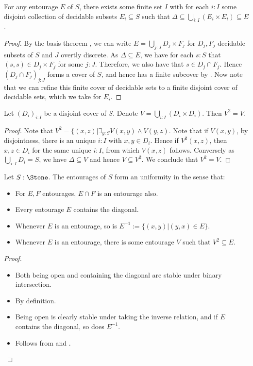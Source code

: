 \begin{lemma}\label{EntourageAsDisjointProduct}
  For any entourage $E$ of $S$, there exists some finite set $I$ with for each $i:I$ some disjoint collection of decidable subsets $E_i\subseteq S$ such that  $\Delta\subseteq \bigcup_{i:I} (E_i \times E_i)\subseteq E$. 
\end{lemma}
\begin{proof}
  By the basis theorem , we can write $E= \bigcup_{j:J} D_j \times F_j$ for $D_j, F_j$ decidable subsets of $S$ and $J$ overtly discrete. 
%
  As $\Delta \subseteq E$, we have for each $s:S$ that $(s,s) \in D_j \times F_j$ for some $j:J$. Therefore, we also have that $s\in D_j \cap F_j$. Hence $(D_j\cap F_j)_{j:J}$ forms a cover of $S$, and hence has a finite subcover by . 
  Now note that we can refine this finite cover of decidable sets to a finite disjoint cover of decidable sets, which we take for $E_i$. 
\end{proof}
\begin{lemma}\label{DisjointProductSquaresToItself}
  Let $(D_i)_{i:I}$ be a disjoint cover of $S$. Denote $V = \bigcup_{i:I} (D_i \times D_i)$. Then $V^2 = V$. 
\end{lemma}
\begin{proof}
  Note that $V^2 = \{(x,z) | \exists_{y:S} V(x,y) \wedge V(y,z)$. Note that if $V(x,y)$, by disjointness, there is an unique $i:I$ with $x,y\in D_i$. Hence if $V^2(x,z)$, then $x,z\in D_i$ for the same unique $i:I$, from which $V(x,z)$ follows. Conversely as $\bigcup_{i:I}D_i = S$, we have $\Delta\subseteq V$ and hence $V\subseteq V^2$. We conclude that $V^2 = V$. 
\end{proof}
\begin{theorem}
  Let $S:\Stone$. The entourages of $S$ form an uniformity in the sense that: 
  \begin{itemize}
    \item For $E,F$ entourages, $E\cap F$ is an entourage also.  
    \item Every entourage $E$ contains the diagonal. 
    \item Whenever $E$ is an entourage, so is $E^{-1}:= \{(x,y) | (y,x) \in E\}$. 
    \item Whenever $E$ is an entourage, there is some entourage $V$ such that $V^2\subseteq E$. 
  \end{itemize}
\end{theorem}
\begin{proof}
  \begin{itemize}
    \item Both being open and containing the diagonal are stable under binary intersection. 
    \item By definition. 
    \item Being open is clearly stable under taking the inverse relation, and if $E$ contains the diagonal, so does $E^{-1}$. 
    \item Follows from  and .
  \end{itemize}
\end{proof}


